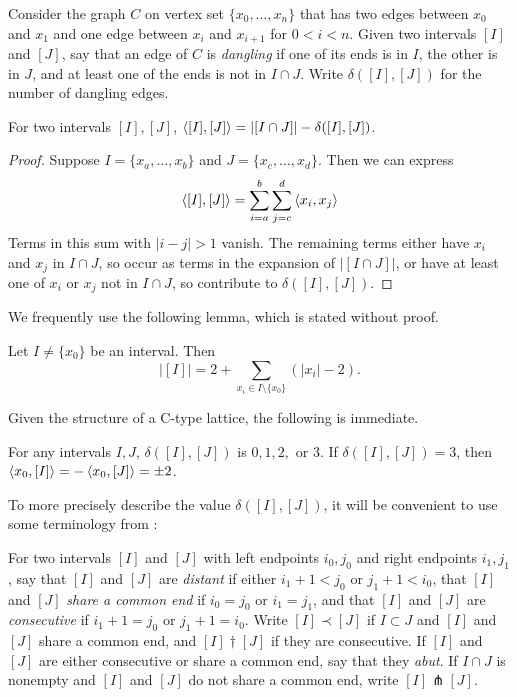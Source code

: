 \begin{definition}
Consider the graph $C$ on vertex set $\{x_0,\dots,x_n\}$ that has two edges between $x_0$ and $x_1$ and one edge between $x_i$ and $x_{i+1}$ for $0 < i < n$. Given two intervals $[I]$ and $[J]$, say that an edge of $C$ is {\it dangling} if one of its ends is in $I$, the other is in $J$, and at least one of the ends is not in $I \cap J$. Write $\delta([I],[J])$ for the number of dangling edges.
\end{definition}

\begin{lemma}\label{intervalproduct}
For two intervals $[I], [J]$, $\left\langle [I] , [J] \right\rangle = |[I \cap J]| - \delta([I],[J])$. 
\end{lemma}
\begin{proof}
Suppose $I = \{x_a,\dots,x_b\}$ and $J = \{x_c,\dots,x_d\}$. Then we can express
\begin{equation*}
\left\langle [I] , [J] \right\rangle = \sum_{i = a}^b \sum_{j = c}^d \left\langle x_i , x_j \right\rangle
\end{equation*}
Terms in this sum with $|i - j| > 1$ vanish. The remaining terms either have $x_i$ and $x_j$ in $I \cap J$, so occur as terms in the expansion of $|[I \cap J]|$, or have at least one of $x_i$ or $x_j$ not in $I \cap J$, so contribute to $\delta([I],[J])$. 
\end{proof}

We frequently use the following lemma, which is stated without proof.

\begin{lemma}\label{Lem:IntervalNorm}
Let $I\ne\{x_0\}$ be an interval.
Then 
\[|[I]|=2+\sum_{x_i\in I\setminus\{x_0\}}(|x_i|-2).\]
\end{lemma}
Given the structure of a C-type lattice, the following is immediate.

\begin{lemma}\label{lem:delta}
For any intervals $I,J$, $\delta([I],[J])$ is $0,1,2,$ or $3$. If $\delta([I],[J]) = 3$, then $\left\langle x_0 , [I] \right\rangle=-\left\langle x_0 , [J] \right\rangle=\pm 2$. 
\end{lemma}

To more precisely describe the value $\delta([I],[J])$, it will be convenient to use some terminology from \cite{greene:LSRP}:

\begin{definition}
For two intervals $[I]$ and $[J]$ with left endpoints $i_0,j_0$ and right endpoints $i_1,j_1$, say that $[I]$ and $[J]$ are {\it distant} if either $i_1 + 1 < j_0$ or $j_1 + 1 < i_0$, that $[I]$ and $[J]$ {\it share a common end} if $i_0 = j_0$ or $i_1 = j_1$, and that $[I]$ and $[J]$ are {\it consecutive} if $i_1 + 1 = j_0$ or $j_1 + 1 = i_0$. Write $[I] \prec [J]$ if $I \subset J$ and $[I]$ and $[J]$ share a common end, and $[I] \dagger [J]$ if they are consecutive. If $[I]$ and $[J]$ are either consecutive or share a common end, say that they {\it abut}. If $I \cap J$ is nonempty and $[I]$ and $[J]$ do not share a common end, write $[I] \pitchfork [J]$. 
\end{definition}

